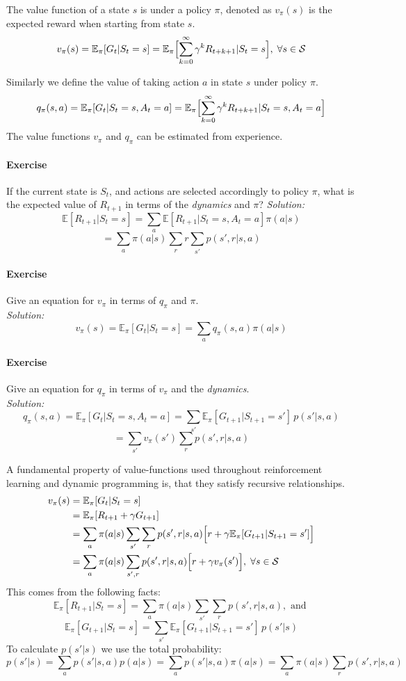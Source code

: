 \documentclass[10pt,a4paper]{article}
\begin{document}
The value function of a state $s$ is under a policy $\pi$, denoted as $v_{\pi}(s)$ is the expected reward when starting from state $s$.
\[ v_{\pi}(s) = \mathbb{E}_{\pi}[G_t | S_t = s] = \mathbb{E}_{\pi} \Bigl [\sum_{k=0}^{\infty} \gamma^k R_{t+k+1} | S_t = s \Bigr ], \; \forall s \in \mathcal{S}\]

Similarly we define the value of taking action $a$ in state $s$ under policy $\pi$.
\[ q_{\pi}(s,a) = \mathbb{E}_{\pi}[ G_t | S_t=s, A_t=a] = \mathbb{E}_{\pi} \Bigl[\sum_{k=0}^{\infty} \gamma^k R_{t+k+1} | S_t = s, A_t=a \Bigr ] \]
The value functions $v_\pi$ and $q_\pi$ can be estimated from experience.

\paragraph{Exercise}
If the current state is $S_t$, and actions are selected accordingly to policy $\pi$, what is the expected value of $R_{t+1}$ in terms of the \textit{dynamics} and $\pi$?
\textit{Solution:}
\[ \mathbb{E}[R_{t+1} | S_t=s] = \sum_a \mathbb{E}[R_{t+1} | S_t=s, A_t = a] \pi(a | s) \]
\[ = \sum_a \pi(a | s) \sum_r r \sum_{s'} p(s',r | s, a)  \]
\paragraph{Exercise}
Give an equation for $v_\pi$ in terms of $q_\pi$ and $\pi$.\\
\textit{Solution:}
\[ v_\pi(s) = \mathbb{E}_\pi[G_t | S_t = s ] = \sum_a q_\pi(s,a) \pi(a | s) \]
\paragraph{Exercise}
Give an equation for $q_\pi$ in terms of $v_\pi$ and the \textit{dynamics}.\\
\textit{Solution:} 
\[ q_\pi(s,a) = \mathbb{E}_\pi [G_t | S_t=s, A_t = a] = 
\sum_{s'} \mathbb{E}_\pi [G_{t+1} | S_{t+1}=s'] \, p(s' | s,a)\]
\[ = \sum_{s'} v_\pi(s') \sum_r p(s',r | s,a) \]

A fundamental property of value-functions used throughout reinforcement learning and dynamic programming is, that they satisfy recursive relationships.
\[  \]
\begin{align*}
v_\pi(s) &= \mathbb{E}_\pi[G_t | S_t=s] \\
&= \mathbb{E}_\pi[ R_{t+1} + \gamma G_{t+1}] \\
&= \sum_a \pi(a|s) \sum_{s'} \sum_r p(s',r | s,a) \Bigl[r + \gamma \mathbb{E}_\pi[G_{t+1}|S_{t+1}=s'] \Bigr ]\\
&= \sum_a \pi(a|s) \sum_{s',r} p(s',r | s,a) \Bigl[r + \gamma v_\pi(s') \Bigr ], \; \forall s \in \mathcal{S}\\
\end{align*}
This comes from the following facts:
\[ \mathbb{E}_\pi[R_{t+1} | S_t=s ] = \sum_a \pi(a|s) \sum_{s'} \sum_r p(s',r | s,a), \text{ and } \]
\[ \mathbb{E}_\pi[G_{t+1} | S_t=s] = \sum_{s'} \mathbb{E}_\pi[G_{t+1} | S_{t+1} = s'] \, p(s'|s) \]
To calculate $p(s'|s)$ we use the total probability:
\[ p(s'|s) = \sum_a p(s' | s,a)p(a|s) = \sum_a p(s'|s,a)\pi(a|s) = \sum_a \pi(a|s) \sum_r p(s',r|s,a)\]
\end{document}
